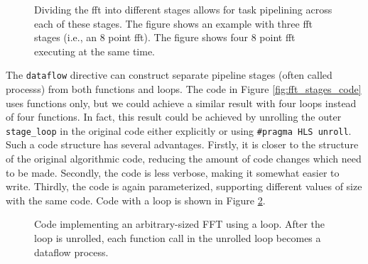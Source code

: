 \begin{figure}
\centering
{\tiny }
{\tiny }
\caption{ Dividing the \gls{fft} into different stages allows for task pipelining across each of these stages. The figure shows an example with three \gls{fft} stages (i.e., an 8 point \gls{fft}). The figure shows four 8 point \gls{fft} executing at the same time. }
\label{fig:fftstages}
\end{figure}

The \lstinline|dataflow| directive can construct separate pipeline stages (often called \glspl{process}) from both functions and loops. The code in Figure \ref{fig:fft_stages_code} uses functions only, but we could achieve a similar result with four loops instead of four functions.  In fact, this result could be achieved by unrolling the outer \lstinline|stage_loop| in the original code either explicitly or using \lstinline|#pragma HLS unroll|.  Such a code structure has several advantages.  Firstly, it is closer to the structure of the original algorithmic code, reducing the amount of code changes which need to be made.   Secondly, the code is less verbose, making it somewhat easier to write.  Thirdly, the code is again parameterized, supporting different values of size with the same code.  Code with a loop is shown in Figure \ref{fig:fft_stages_loop_code}.

\begin{figure}
\begin{scriptsize}

\end{scriptsize}
\caption{Code implementing an arbitrary-sized FFT using a loop. After the loop is unrolled, each function call in the unrolled loop becomes a dataflow process. }
\label{fig:fft_stages_loop_code}
\end{figure}

